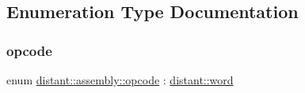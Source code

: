 \subsection{Enumeration Type Documentation}
\mbox{\label{namespacedistant_1_1assembly_a64d7b047d9e3df1ac04919f7c4f8f6fa}} 
\subsubsection{\texorpdfstring{opcode}{opcode}}
{\footnotesize\ttfamily enum \mbox{\hyperlink{namespacedistant_1_1assembly_a64d7b047d9e3df1ac04919f7c4f8f6fa}{distant\+::assembly\+::opcode}} \+: \mbox{\hyperlink{namespacedistant_a615d26c8218c108ba83dfea768c0e130}{distant\+::word}}\hspace{0.3cm}{\ttfamily [strong]}}

